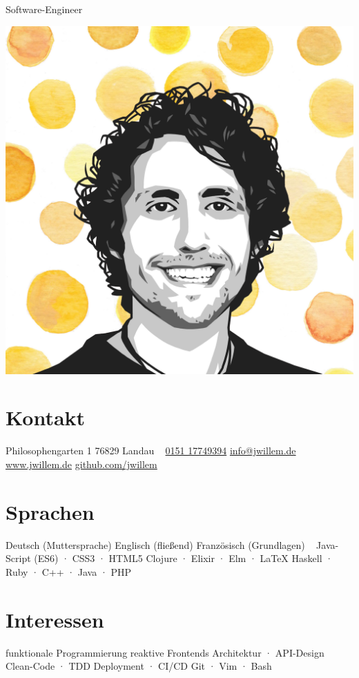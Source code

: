\documentclass[]{friggeri-cv}
\begin{document}
       {Software-Engineer}


\begin{aside}
\includegraphics[width=\textwidth]{avatar.png}
  \section{Kontakt}
    Philosophengarten 1
    76829 Landau
    ~
    \href{tel:+4915117749394}{0151 17749394}
    \href{mailto:info@jwillem.de}{info@jwillem.de}
    \href{http://jwillem.de}{www.jwillem.de}
    \href{http://github.com/jwillem}{github.com/jwillem}
  \section{Sprachen}
    Deutsch {\footnotesize{(Muttersprache)}}
    Englisch {\footnotesize{(fließend)}}
    Französisch {\footnotesize{(Grundlagen)}}
    ~
    {\footnotesize Java-Script (ES6) · CSS3 · HTML5}
    {\footnotesize Clojure · Elixir · Elm · \LaTeX}
    {\footnotesize Haskell · Ruby · C++ · Java · PHP}
  \section{Interessen}
  funktionale Programmierung
  reaktive Frontends
  Architektur · API-Design
  Clean-Code · TDD
  Deployment · CI/CD
  Git · Vim · Bash

\end{aside}
\end{document}

